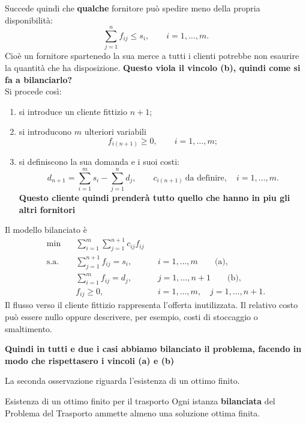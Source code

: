 Succede quindi che \textbf{qualche} fornitore può spedire meno della propria disponibilità:
\[
\sum_{j=1}^n f_{ij}\leq s_i,\qquad i=1,\ldots,m.
\]
Cioè un fornitore spartenedo la sua merce a tutti i clienti potrebbe non esaurire la quantità che ha disposizione.
\textbf{Questo viola il vincolo (b), quindi come si fa a bilanciarlo?}
\\
Si procede così:
\begin{enumerate}
\item si introduce un cliente fittizio \(n+1\);
\item si introducono \(m\) ulteriori variabili
\[
f_{i(n+1)}\geq0,\qquad i=1,\ldots,m;
\]
\item si definiscono la sua domanda e i suoi costi:
\[
d_{n+1}=\sum_{i=1}^m s_i-\sum_{j=1}^n d_j,
\qquad
c_{i(n+1)}\ \text{da definire},\quad i=1,\ldots,m.
\]
\textbf{Questo cliente quindi prenderà tutto quello che hanno in piu gli altri fornitori}
\end{enumerate}
Il modello bilanciato è
\begin{align*}
\min\quad &\sum_{i=1}^m\sum_{j=1}^{n+1}c_{ij}f_{ij}\\
\text{s.a.}\quad
&\sum_{j=1}^{n+1}f_{ij}=s_i,
&&i=1,\ldots,m \qquad\text{(a)},\\
&\sum_{i=1}^m f_{ij}=d_j,
&&j=1,\ldots,n+1 \qquad\text{(b)},\\
&f_{ij}\geq0,
&&i=1,\ldots,m,\quad j=1,\ldots,n+1.
\end{align*}
Il flusso verso il cliente fittizio rappresenta l'offerta inutilizzata.
Il relativo costo può essere nullo oppure descrivere, per esempio,
costi di stoccaggio o smaltimento.


\textbf{Quindi in tutti e due i casi abbiamo bilanciato il problema, facendo in modo che rispettasero i vincoli (a) e (b)}


La seconda osservazione riguarda l'esistenza di un ottimo finito.

\newpage

\begin{theorem}{Esistenza di un ottimo finito per il trasporto}
\label{thm:trasporto-ottimo}
Ogni istanza \textbf{bilanciata} del Problema del Trasporto
ammette almeno una soluzione ottima finita.
\end{theorem}


